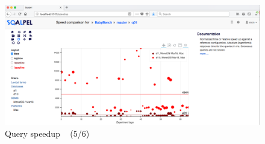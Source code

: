 \documentclass{cidr-2019}
\begin{document}


\begin{figure}[t!]
\centering
\includegraphics[width=\textwidth]{Figures/speedup3.png}
\caption{Query speedup ~ \textsf{(5/6)}
	\label{fig:speedup2}}
\end{figure}











\end{document}
